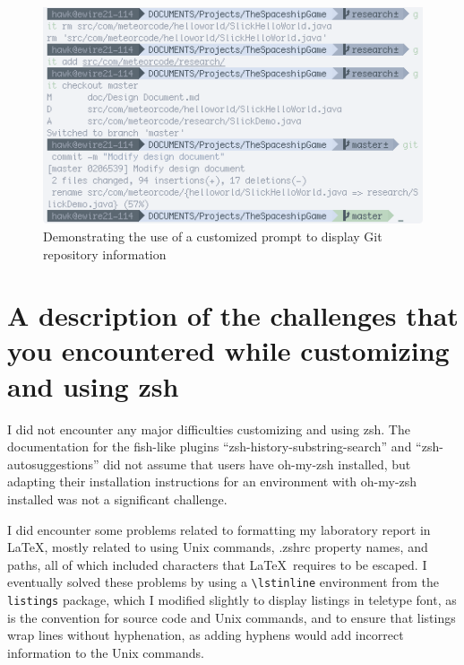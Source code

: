 \documentclass[12pt,a4paper]{article}
\begin{document}
		\begin{figure}[!htb]
			\includegraphics[resolution=72, scale=0.75]{Lab1Images/demos/gitdemo.png}
			\caption{Demonstrating the use of a customized prompt to display Git repository information}
			\label{git}
		\end{figure}
		\FloatBarrier
	\section{A description of the challenges that you encountered while customizing and using zsh}

		I did not encounter any major difficulties customizing and using zsh. The documentation for the fish-like plugins ``zsh-history-substring-search'' and ``zsh-autosuggestions'' did not assume that users have oh-my-zsh installed, but adapting their installation instructions for an environment with oh-my-zsh installed was not a significant challenge.

		I did encounter some problems related to formatting my laboratory report in \LaTeX, mostly related to using Unix commands, .zshrc property names, and paths, all of which included characters that \LaTeX\ requires to be escaped. I eventually solved these problems by using a \lstinline!\lstinline! environment from the \lstinline{listings} package, which I modified slightly to display listings in teletype font, as is the convention for source code and Unix commands, and to ensure that listings wrap lines without hyphenation, as adding hyphens would add incorrect information to the Unix commands.
\end{document}
